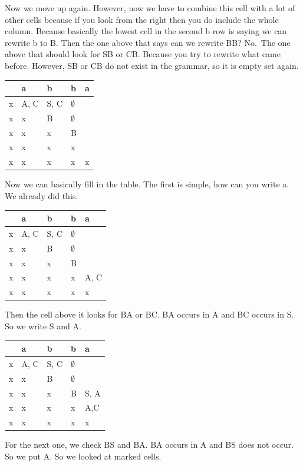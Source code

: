 \documentclass[
  11pt,
  british,
]{article}
\begin{document}
Now we move up again. However, now we have to combine this cell with a
lot of other cells because if you look from the right then you do
include the whole column. Because basically the lowest cell in the
second b row is saying we can rewrite b to B. Then the one above that
says can we rewrite BB? No.~The one above that should look for SB or CB.
Because you try to rewrite what came before. However, SB or CB do not
exist in the grammar, so it is empty set again.

\begin{longtable}[]{@{}lllll@{}}
\toprule
& a & b & b & a \\
\midrule
\endhead
x & A, C & S, C & \(\emptyset\) & \\
x & x & B & \(\emptyset\) & \\
x & x & x & B & \\
x & x & x & x & \\
x & x & x & x & x \\
\bottomrule
\end{longtable}

Now we can basically fill in the table. The first is simple, how can you
write a. We already did this.

\begin{longtable}[]{@{}lllll@{}}
\toprule
& a & b & b & a \\
\midrule
\endhead
x & A, C & S, C & \(\emptyset\) & \\
x & x & B & \(\emptyset\) & \\
x & x & x & B & \\
x & x & x & x & A, C \\
x & x & x & x & x \\
\bottomrule
\end{longtable}

Then the cell above it looks for BA or BC. BA occurs in A and BC occurs
in S. So we write S and A.

\begin{longtable}[]{@{}lllll@{}}
\toprule
& a & b & b & a \\
\midrule
\endhead
x & A, C & S, C & \(\emptyset\) & \\
x & x & B & \(\emptyset\) & \\
x & x & x & B & S, A \\
x & x & x & x & A,C \\
x & x & x & x & x \\
\bottomrule
\end{longtable}

For the next one, we check BS and BA. BA occurs in A and BS does not
occur. So we put A. So we looked at marked cells.
\end{document}
